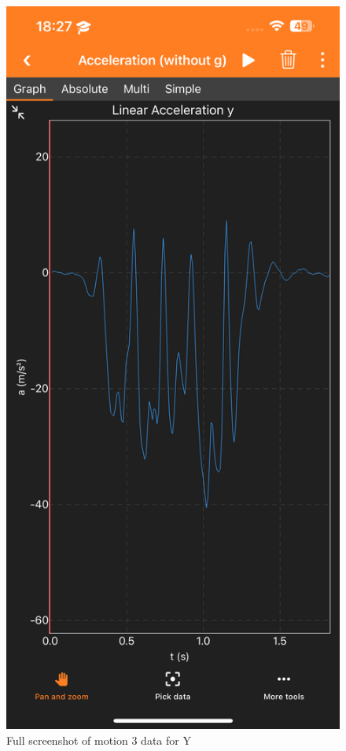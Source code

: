 \documentclass[idxtotoc,hyperref,openany]{labbook} %
\begin{document}
\begin{figure}[H] %
\begin{center}
\includegraphics[width=.55\linewidth]{images/Lab.03/Lab03Motion3Y.PNG}
\end{center}
\caption{Full screenshot of motion 3 data for Y}
\label{fig:Lab03-Motion3-Y}
\end{figure}
\end{document}

